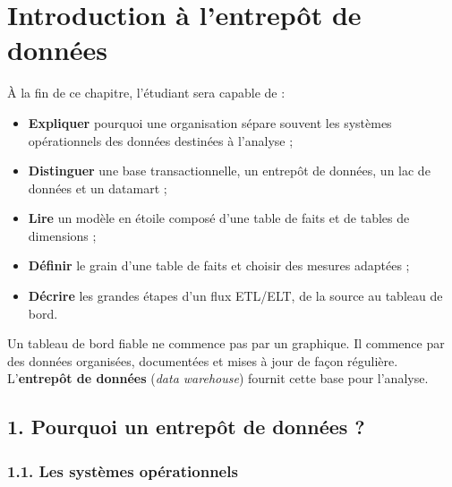 \documentclass[
  french,
  letterpaper,
  open=any]{scrbook}
\providecommand{\tightlist}{%
  \setlength{\itemsep}{0pt}\setlength{\parskip}{0pt}}
\theoremstyle{definition}
\theoremstyle{definition}
\theoremstyle{remark}
\begin{document}

\chapter{Introduction à l'entrepôt de
données}\label{introduction-uxe0-lentrepuxf4t-de-donnuxe9es}

\begin{tcolorbox}[enhanced jigsaw, arc=.35mm, bottomrule=.15mm, bottomtitle=1mm, breakable, colback=white, colbacktitle=quarto-callout-tip-color!10!white, colframe=quarto-callout-tip-color-frame, coltitle=black, left=2mm, leftrule=.75mm, opacityback=0, opacitybacktitle=0.6, rightrule=.15mm, title=\textcolor{quarto-callout-tip-color}{\faLightbulb}\hspace{0.5em}{Objectifs du chapitre}, titlerule=0mm, toprule=.15mm, toptitle=1mm]

À la fin de ce chapitre, l'étudiant sera capable de :

\begin{itemize}
\tightlist
\item
  \textbf{Expliquer} pourquoi une organisation sépare souvent les
  systèmes opérationnels des données destinées à l'analyse ;
\item
  \textbf{Distinguer} une base transactionnelle, un entrepôt de données,
  un lac de données et un datamart ;
\item
  \textbf{Lire} un modèle en étoile composé d'une table de faits et de
  tables de dimensions ;
\item
  \textbf{Définir} le grain d'une table de faits et choisir des mesures
  adaptées ;
\item
  \textbf{Décrire} les grandes étapes d'un flux ETL/ELT, de la source au
  tableau de bord.
\end{itemize}

\end{tcolorbox}

Un tableau de bord fiable ne commence pas par un graphique. Il commence
par des données organisées, documentées et mises à jour de façon
régulière. L'\textbf{entrepôt de données} (\emph{data warehouse})
fournit cette base pour l'analyse.

\section{1. Pourquoi un entrepôt de données
?}\label{pourquoi-un-entrepuxf4t-de-donnuxe9es}

\subsection{1.1. Les systèmes
opérationnels}\label{les-systuxe8mes-opuxe9rationnels}
\end{document}

